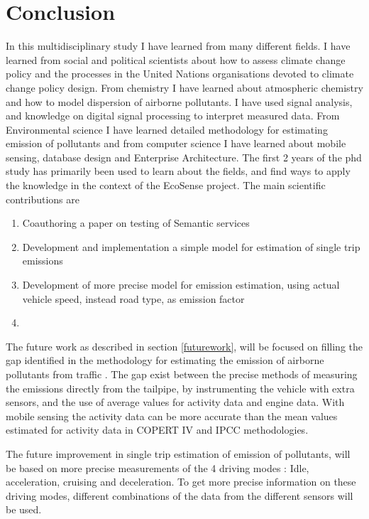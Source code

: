 \section{Conclusion}



In this multidisciplinary study I have learned from many different fields. I have learned from social and political scientists about how to assess climate change policy and the processes in the United Nations organisations devoted to climate change policy design. From chemistry I have learned about atmospheric chemistry and how to model dispersion of airborne pollutants. I have used signal analysis, and knowledge on digital signal processing to interpret measured data. From Environmental science I have learned detailed methodology for estimating emission of pollutants and from computer science I have learned about mobile sensing, database design and Enterprise Architecture.
The first 2 years of the phd study has primarily been used to learn about the fields, and find ways to apply the knowledge in the context of the EcoSense project.
The main scientific contributions are
\begin{enumerate}
	\item{Coauthoring a paper on testing of Semantic services}
	\item{Development and implementation a simple model for estimation of single trip emissions}
	\item{Development of more precise model for emission estimation, using actual vehicle speed, instead road type, as emission factor}
	\item{}
\end{enumerate}
The future work as described in section \ref{futurework}, will be focused on filling the gap identified in the methodology for estimating the emission of airborne pollutants from traffic . The gap exist between the precise methods of measuring the  emissions directly from the tailpipe, by instrumenting the vehicle with extra sensors, and the use of average values for activity data and engine data. With mobile sensing the activity data can be more accurate than the mean values estimated for activity data in COPERT IV and IPCC methodologies.

The future improvement in single trip estimation of emission of pollutants, will be based on more precise measurements of the 4 driving modes : Idle, acceleration, cruising and deceleration. To get more precise information on these driving modes, different combinations of the data from the different sensors will be used.


